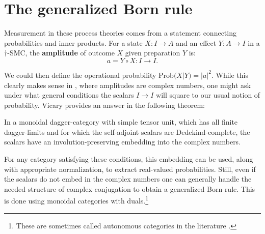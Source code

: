 \section{The generalized Born rule}
\label{sec:bornrule}
Measurement in these process theories comes from a statement connecting probabilities and inner products. For a state $X:I\to A$ and an effect $Y:A\to I$ in a $\dagger$-SMC, the \textbf{amplitude} of outcome $X$ given preparation $Y$ is:
\begin{equation}
a = Y\circ X:I\to I.
\end{equation}


\noindent We could then define the operational probability Prob$(X|Y)=|a|^2$. While this clearly makes sense in , where amplitudes are complex numbers, one might ask under what general conditions the scalars $I\to I$ will square to our usual notion of probability. Vicary provides an answer in the following theorem:
\begin{theorem}{\cite[Thm 4.2]{vicary2011completeness}}
In a monoidal dagger-category with simple tensor unit, which has all finite dagger-limits and for which the self-adjoint scalars are Dedekind-complete, the scalars have an involution-preserving embedding into the complex numbers.
\end{theorem}
\noindent For any category satisfying these conditions, this embedding can be used, along with appropriate normalization, to extract real-valued probabilities. Still, even if the scalars do not embed in the complex numbers one can generally handle the needed structure of complex conjugation to obtain a generalized Born rule. This is done using monoidal categories with duals.\footnote{These are sometimes called autonomous categories in the literature \cite{joyal1993braided,selinger2011survey}.}

